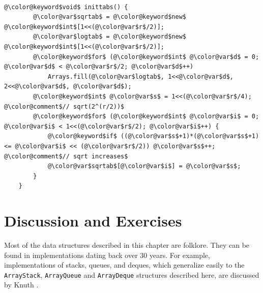 \documentclass[10pt]{book}
\theoremstyle{plain}
\theoremstyle{definition}
\begin{document}


 \ \vspace{.5ex}\begin{Verbatim}[gobble=1,tabsize=2,frame=single,framerule=1.2pt,commandchars=\\@\$,label=\texttt{FastSqrt},labelposition=topline]
	@\color@keyword$void$ inittabs() {
		@\color@var$sqrtab$ = @\color@keyword$new$ @\color@keyword$int$[1<<(@\color@var$r$/2)];
		@\color@var$logtab$ = @\color@keyword$new$ @\color@keyword$int$[1<<(@\color@var$r$/2)];
		@\color@keyword$for$ (@\color@keyword$int$ @\color@var$d$ = 0; @\color@var$d$ < @\color@var$r$/2; @\color@var$d$++) 
			Arrays.fill(@\color@var$logtab$, 1<<@\color@var$d$, 2<<@\color@var$d$, @\color@var$d$);
		@\color@keyword$int$ @\color@var$s$ = 1<<(@\color@var$r$/4);                    @\color@comment$// sqrt(2^(r/2))$
		@\color@keyword$for$ (@\color@keyword$int$ @\color@var$i$ = 0; @\color@var$i$ < 1<<(@\color@var$r$/2); @\color@var$i$++) {
			@\color@keyword$if$ ((@\color@var$s$+1)*(@\color@var$s$+1) <= @\color@var$i$ << (@\color@var$r$/2)) @\color@var$s$++; @\color@comment$// sqrt increases$
			@\color@var$sqrtab$[@\color@var$i$] = @\color@var$s$;
		}
	}
\end{Verbatim}


\section{Discussion and Exercises}

Most of the data structures described in this chapter are folklore. They
can be found in implementations dating back over 30 years.  For example,
implementations of stacks, queues, and deques, which generalize easily
to the \texttt{ArrayStack}, \texttt{ArrayQueue} and \texttt{ArrayDeque} structures described
here, are discussed by Knuth \cite[Section~2.2.2]{k97v1}.
\end{document}
